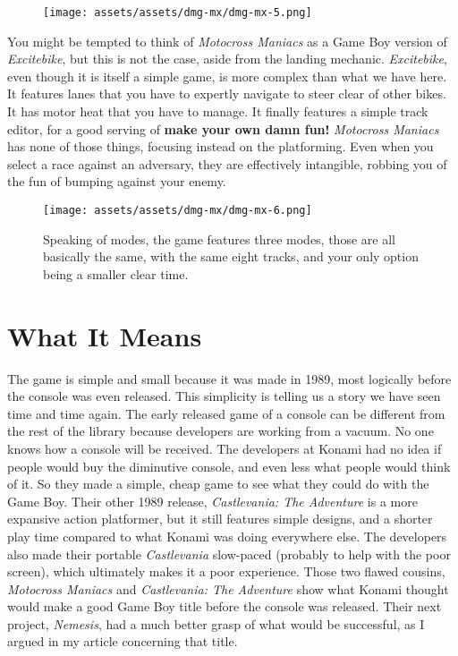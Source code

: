 \documentclass{book}
\begin{document}
\begin{figure}[hbt]
\vskip 10pt
\centering \texttt{[image: assets/assets/dmg-mx/dmg-mx-5.png]}
\vskip 6pt
\end{figure}

You might be tempted to think of \emph{Motocross Maniacs} as a Game Boy version of \emph{Excitebike}, but this is not the case, aside from the landing mechanic. \emph{Excitebike}, even though it is itself a simple game, is more complex than what we have here. It features lanes that you have to expertly navigate to steer clear of other bikes. It has motor heat that you have to manage. It finally features a simple track editor, for a good serving of \textbf{make your own damn fun!} \emph{Motocross Maniacs} has none of those things, focusing instead on the platforming. Even when you select a race against an adversary, they are effectively intangible, robbing you of the fun of bumping against your enemy.

\begin{figure}[hbt]
\vskip 10pt
\centering \texttt{[image: assets/assets/dmg-mx/dmg-mx-6.png]}\par\pagetwodescription Speaking of modes, the game features three modes, those are all basically the same, with the same eight tracks, and your only option being a smaller clear time.
\vskip 6pt
\end{figure}

\FloatBarrier\needspace{10mm}\section*{What It Means}\nopagebreak[4]

The game is simple and small because it was made in 1989, most logically before the console was even released. This simplicity is telling us a story we have seen time and time again. The early released game of a console can be different from the rest of the library because developers are working from a vacuum. No one knows how a console will be received. The developers at Konami had no idea if people would buy the diminutive console, and even less what people would think of it. So they made a simple, cheap game to see what they could do with the Game Boy. Their other 1989 release, \emph{Castlevania: The Adventure} is a more expansive action platformer, but it still features simple designs, and a shorter play time compared to what Konami was doing everywhere else. The developers also made their portable \emph{Castlevania} slow-paced (probably to help with the poor screen), which ultimately makes it a poor experience. Those two flawed cousins, \emph{Motocross Maniacs} and \emph{Castlevania: The Adventure} show what Konami thought would make a good Game Boy title before the console was released. Their next project, \emph{Nemesis}, had a much better grasp of what would be successful, as I argued in my article concerning that title.
\end{document}
